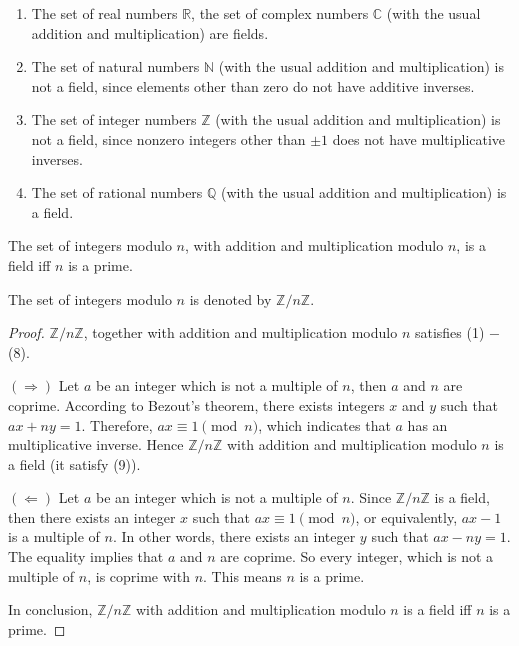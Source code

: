 \begin{example}
    \begin{enumerate}[label = (\alph*)]
        \item The set of real numbers $\mathbb{R}$, the set of complex numbers $\mathbb{C}$ (with the usual addition and multiplication) are fields.
        \item The set of natural numbers $\mathbb{N}$ (with the usual addition and multiplication) is not a field, since elements other than zero do not have additive inverses.
        \item The set of integer numbers $\mathbb{Z}$ (with the usual addition and multiplication) is not a field, since nonzero integers other than $\pm 1$ does not have multiplicative inverses.
        \item The set of rational numbers $\mathbb{Q}$ (with the usual addition and multiplication) is a field.
    \end{enumerate}
\end{example}

\begin{definition}
\end{definition}

\begin{theorem}
    The set of integers modulo $n$, with addition and multiplication modulo $n$, is a field iff $n$ is a prime.
\end{theorem}

The set of integers modulo $n$ is denoted by $\mathbb{Z}/n\mathbb{Z}$.

\begin{proof}
    $\mathbb{Z}/n\mathbb{Z}$, together with addition and multiplication modulo $n$ satisfies (1) $-$ (8).

    $(\Rightarrow)$ Let $a$ be an integer which is not a multiple of $n$, then $a$ and $n$ are coprime. According to Bezout's theorem, there exists integers $x$ and $y$ such that $ax + ny = 1$. Therefore, $ax\equiv 1\pmod{n}$, which indicates that $a$ has an multiplicative inverse. Hence $\mathbb{Z}/n\mathbb{Z}$ with addition and multiplication modulo $n$ is a field (it satisfy (9)).

    $(\Leftarrow)$ Let $a$ be an integer which is not a multiple of $n$. Since $\mathbb{Z}/n\mathbb{Z}$ is a field, then there exists an integer $x$ such that $ax\equiv 1\pmod{n}$, or equivalently, $ax - 1$ is a multiple of $n$. In other words, there exists an integer $y$ such that $ax - ny = 1$. The equality implies that $a$ and $n$ are coprime. So every integer, which is not a multiple of $n$, is coprime with $n$. This means $n$ is a prime.

    In conclusion, $\mathbb{Z}/n\mathbb{Z}$ with addition and multiplication modulo $n$ is a field iff $n$ is a prime.
\end{proof}

